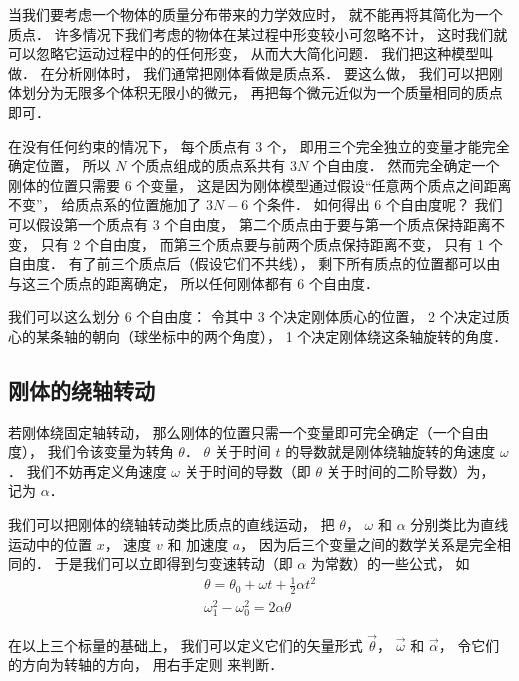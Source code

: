 

当我们要考虑一个物体的质量分布带来的力学效应时， 就不能再将其简化为一个质点． 许多情况下我们考虑的物体在某过程中形变较小可忽略不计， 这时我们就可以忽略它运动过程中的的任何形变， 从而大大简化问题． 我们把这种模型叫做． 在分析刚体时， 我们通常把刚体看做是质点系． 要这么做， 我们可以把刚体划分为无限多个体积无限小的微元， 再把每个微元近似为一个质量相同的质点即可． 

在没有任何约束的情况下， 每个质点有 3 个， 即用三个完全独立的变量才能完全确定位置， 所以 $N$ 个质点组成的质点系共有 $3N$ 个自由度． 然而完全确定一个刚体的位置只需要 6 个变量， 这是因为刚体模型通过假设“任意两个质点之间距离不变”， 给质点系的位置施加了 $3N - 6$ 个条件． 如何得出 6 个自由度呢？ 我们可以假设第一个质点有 3 个自由度， 第二个质点由于要与第一个质点保持距离不变， 只有 2 个自由度， 而第三个质点要与前两个质点保持距离不变， 只有 1 个自由度． 有了前三个质点后（假设它们不共线）， 剩下所有质点的位置都可以由与这三个质点的距离确定， 所以任何刚体都有 6 个自由度．

我们可以这么划分 6 个自由度： 令其中 3 个决定刚体质心的位置， 2 个决定过质心的某条轴的朝向（球坐标中的两个角度）， 1 个决定刚体绕这条轴旋转的角度．

\subsection{刚体的绕轴转动}

若刚体绕固定轴转动， 那么刚体的位置只需一个变量即可完全确定（一个自由度）， 我们令该变量为转角 $\theta$． $\theta$ 关于时间 $t$ 的导数就是刚体绕轴旋转的角速度 $\omega$． 我们不妨再定义角速度 $\omega$ 关于时间的导数（即 $\theta$ 关于时间的二阶导数）为， 记为 $\alpha$．

我们可以把刚体的绕轴转动类比质点的直线运动， 把 $\theta$， $\omega$ 和 $\alpha$ 分别类比为直线运动中的位置 $x$， 速度 $v$ 和 加速度 $a$， 因为后三个变量之间的数学关系是完全相同的． 于是我们可以立即得到匀变速转动（即 $\alpha$ 为常数）的一些公式， 如
\begin{gather}
\theta = \theta_0 + \omega t + \frac 12 \alpha t^2\\
\omega_1^2 - \omega_0^2 = 2\alpha \theta
\end{gather}

在以上三个标量的基础上， 我们可以定义它们的矢量形式 $\vec \theta$， $\vec \omega$ 和 $\vec \alpha$， 令它们的方向为转轴的方向， 用右手定则 来判断．

